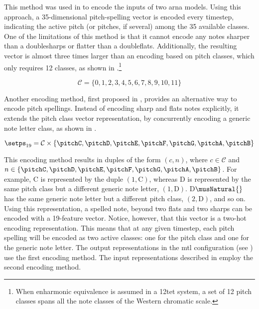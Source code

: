 This method was used in \textcite{micchi2020not,
micchi2021deep} to encode the inputs of two \gls{arna}
models. Using this approach, a 35-dimensional pitch-spelling
vector is encoded every timestep, indicating the active
pitch (or pitches, if several) among the 35 available
classes. One of the limitations of this method is that it
cannot encode any notes sharper than a \glspl{doublesharp}
or flatter than a \glspl{doubleflat}. Additionally, the
resulting vector is almost three times larger than an
encoding based on pitch classes, which only requires 12
classes, as shown in .\footnote{When
enharmonic equivalence is assumed in a \gls{12tet} system, a
set of 12 pitch classes spans all the note classes of the
Western chromatic scale.}

\begin{equation}
    \label{eq:pitch_classes}
    \mathcal{C} = \{0, 1, 2, 3, 4, 5, 6, 7, 8, 9, 10, 11\}
\end{equation}



Another encoding method, first proposed in
\textcite{napoleslopez2021augmentednet}, provides an
alternative way to encode pitch spellings. Instead of
encoding \gls{sharp} and \glspl{flat} notes explicitly, it
extends the pitch class vector representation, by
concurrently encoding a generic note letter class, as shown
in .

\begin{equation}
    \label{eq:pitch_spelling_19}
    \setps_{19} = \mathcal{C}
    \times \{ \pitchC, \pitchD, \pitchE, \pitchF, \pitchG, \pitchA, \pitchB \}
\end{equation}


This encoding method results in duples of the form $(c, n)$,
where $c \in \mathcal{C}$ and $n \in \{\pitchC, \pitchD,
\pitchE, \pitchF, \pitchG, \pitchA, \pitchB\}$. For example,
C\musSharp{} is represented by the duple $(1, \text{C})$,
whereas D\musFlat{} is represented by the same pitch class
but a different generic note letter, $(1, \text{D})$.
D$\musNatural{}$ has the same generic note letter but a
different pitch class, $(2, \text{D})$, and so on. Using
this representation, a spelled note, beyond two flats and
two sharps can be encoded with a 19-feature vector. Notice,
however, that this vector is a two-hot encoding
representation. This means that at any given timestep, each
pitch spelling will be encoded as two active classes: one
for the pitch class and one for the generic note letter. The
output representations in the \gls{mtl} configuration (see
) use the first encoding
method. The input representations described in
 employ the second encoding
method. 
